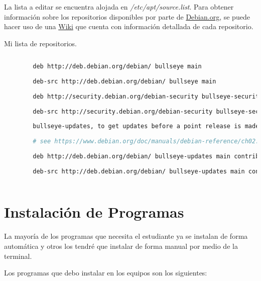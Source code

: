 		La lista a editar se encuentra alojada en \textit{/etc/apt/source.list}. Para obtener información sobre los repositorios disponibles por parte de \href{https://www.debian.org}{\color{blue}{}Debian.org}, se puede hacer uso de una \href{https://wiki.debian.org/SourcesList/}{\color{blue}{}Wiki} que cuenta con información detallada de cada repositorio.\par
		
		Mi lista de repositorios.\par
			
	\begin{lstlisting}[language=bash, caption=Repositorios]
		
		deb http://deb.debian.org/debian/ bullseye main
		
		deb-src http://deb.debian.org/debian/ bullseye main
		 
		deb http://security.debian.org/debian-security bullseye-security main contrib
		
		deb-src http://security.debian.org/debian-security bullseye-security main contrib
		 
		bullseye-updates, to get updates before a point release is made;
		
		# see https://www.debian.org/doc/manuals/debian-reference/ch02.en.html#_updates_and_backports
		
		deb http://deb.debian.org/debian/ bullseye-updates main contrib
		
		deb-src http://deb.debian.org/debian/ bullseye-updates main contrib
		
	\end{lstlisting}	
			
	\section{Instalación de Programas}
		
		La mayoría de los programas que necesita el estudiante ya se instalan de forma automática y otros los tendré que instalar de forma manual por medio de la terminal.\par
		
		Los programas que debo instalar en los equipos son los siguientes:\par
		
